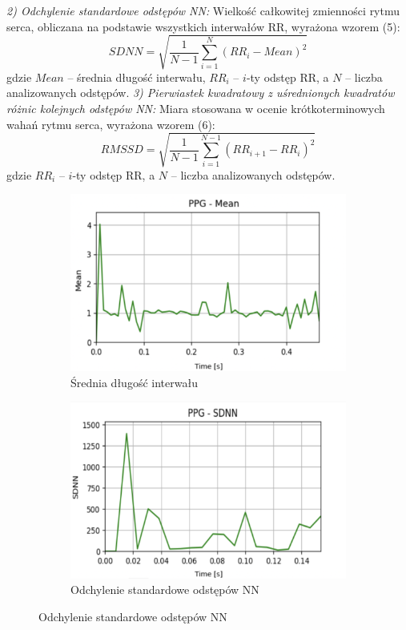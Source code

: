 \documentclass[journal]{IEEEtran}
\begin{document}
{\noindent\textit{2) Odchylenie standardowe odstępów NN:} 
Wielkość całkowitej zmienności rytmu serca, obliczana na podstawie wszystkich interwałów RR, wyrażona wzorem (5):
\begin{equation}
    SDNN = \sqrt{\frac{1}{N-1} \sum_{i=1}^{N} (RR_i - Mean)^2}
\end{equation}
gdzie $Mean$ – średnia długość interwału, $RR_i$ – $i$-ty odstęp RR, a $N$ – liczba analizowanych odstępów. 
\newpage
\noindent\textit{3) Pierwiastek kwadratowy z uśrednionych kwadratów różnic kolejnych odstępów NN:} 
Miara stosowana w ocenie krótkoterminowych wahań rytmu serca, wyrażona wzorem (6):
\begin{equation}
    RMSSD = \sqrt{\frac{1}{N-1} \sum_{i=1}^{N-1} (RR_{i+1} - RR_i)^2}
\end{equation}
gdzie $RR_i$ -- $i$-ty odstęp RR, a $N$ – liczba analizowanych odstępów.

\begin{figure}[h]
    \centering
    \begin{subfigure}{0.47\textwidth}
        \centering
        \includegraphics[width=\linewidth]{Mean.png}
        \caption{Średnia długość interwału}
    \end{subfigure}
    
   \vspace{0.2cm} 
    \begin{subfigure}{0.47\textwidth}
        \centering
        \includegraphics[width=\linewidth]{SDNN.png}
        \caption{Odchylenie standardowe odstępów NN}
    \end{subfigure}
    

\end{figure}}
\end{document}

